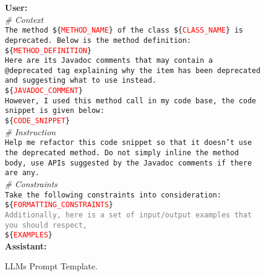 \documentclass[sigconf,review,anonymous]{acmart}
\newcommand{\templatevar}[1]{\$\{\textcolor{red}{#1}\}}
\begin{document}
\begin{figure}
  \centering
  \begin{tcolorbox}[
    colback=prompt_bg,
    colframe=prompt_title,
    title=Prompt Template,
    subtitle style={boxrule=0.4pt, colback=yellow!50!blue!25!white, colupper=black}
  ]
  \scriptsize

  \textbf{User:}\\
  \textit{\# Context}\\
  \texttt{The method \templatevar{METHOD\_NAME} of the class \templatevar{CLASS\_NAME} is deprecated. Below is the method definition:}\\
  \texttt{\templatevar{METHOD\_DEFINITION}}\\

  \texttt{Here are its Javadoc comments that may contain a @deprecated tag explaining why the item has been deprecated and suggesting what to use instead.}\\
  \texttt{\templatevar{JAVADOC\_COMMENT}}\\

  \texttt{However, I used this method call in my code base, the code snippet is given below:}\\
  \texttt{\templatevar{CODE\_SNIPPET}}\\

  \textit{\# Instruction}\\
  \texttt{Help me refactor this code snippet so that it doesn't use the deprecated method. Do not simply inline the method body, use APIs suggested by the Javadoc comments if there are any.}\\

  \textit{\# Constraints}\\
  \texttt{Take the following constraints into consideration:}\\
  \texttt{\templatevar{FORMATTING\_CONSTRAINTS}}\\

  \texttt{\textcolor{gray}{Additionally, here is a set of input/output examples that you should respect,}}\\
  \texttt{\templatevar{EXAMPLES}}\\

  \textbf{Assistant:}\\
  \end{tcolorbox}
  \caption{LLMs Prompt Template.}
  \label{fig:prompt}
\end{figure}
\end{document}
